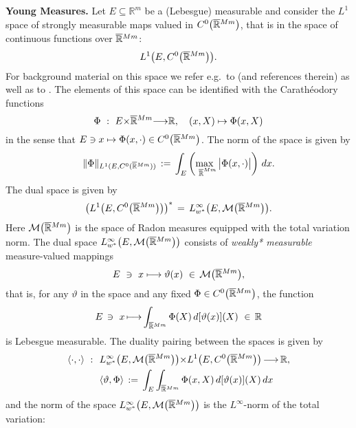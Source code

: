 \documentclass{amsart}
\theoremstyle{definition}
\numberwithin{equation}{section}
\begin{document}
{\medskip}

{\noindent} \textbf{Young Measures.} Let $E{\subseteq} {\mathbb{R}}^m$ be a (Lebesgue) measurable and consider the $L^1$ space of strongly measurable maps valued in $C^0\big(\smash{\overline{\mathbb{R}}}^{Mm}\big)$, that is in the space of continuous functions over $\smash{\overline{\mathbb{R}}}^{Mm}$:
\[
L^1\big( E, C^0\big(\smash{\overline{\mathbb{R}}}^{Mm}\big)\big).
\]
For background material on this space we refer e.g.\ to \cite{FL,FG,Ed,V} (and references therein) as well as to \cite{K8,K9}. The elements of this space can be identified with the Carath\'eodory functions
\[
\Phi\ :\ E {\times} \smash{\overline{\mathbb{R}}}^{Mm} {\longrightarrow} {\mathbb{R}}, \quad (x,X)\mapsto \Phi(x,X)
\]
in the sense that $E\ni x\mapsto \Phi(x,\cdot) \in C^0\big(\smash{\overline{\mathbb{R}}}^{Mm}\big)$. The norm of the space is given by
\[
\| \Phi \|_{L^1( E, C^0(\smash{\overline{\mathbb{R}}}^{Mm}))}\, :=\, \int_E \left(\!\! \max_{\ \ {\overline{\mathbb{R}}}^{Mm}} \big|\Phi(x,\cdot)\big|\right)\, dx.
\]
The dual space is given by 
\[
\left( L^1\big( E, C^0\big(\smash{\overline{\mathbb{R}}}^{Mm}\big)\big) \right)^* \, =\, L^\infty_{w^*}\big( E,{\mathcal{M}} \big(\smash{\overline{\mathbb{R}}}^{Mm}\big) \big).
\]
Here ${\mathcal{M}} \big(\smash{\overline{\mathbb{R}}}^{Mm}\big)$ is the space of Radon measures equipped with the total variation norm. The dual space $L^\infty_{w^*}\big( E,{\mathcal{M}} \big(\smash{\overline{\mathbb{R}}}^{Mm}\big)\big)$ consists of \emph{weakly* measurable} measure-valued mappings
\[
E\ \ni \ x \longmapsto \vartheta(x)  \ \in\, {\mathcal{M}} \big(\smash{\overline{\mathbb{R}}}^{Mm}\big),
\]
that is, for any $\vartheta$ in the space and any fixed $\Phi \in C^0\big(\smash{\overline{\mathbb{R}}}^{Mm}\big)$, the function 
\[
E\, \ni\  x\, {\longmapsto}  \int_{ \smash{\overline{\mathbb{R}}}^{Mm} } \Phi(X)\, d[\vartheta(x)](X) \ \in \, {\mathbb{R}}
\]
is Lebesgue measurable. The duality pairing between the spaces is given by
\[
\begin{split}
\langle\cdot,\cdot\rangle\ :\  \ & L^\infty_{w^*}\big( E,{\mathcal{M}} \big(\smash{\overline{\mathbb{R}}}^{Mm}\big) \big) {\times} L^1\big( E, C^0\big(\smash{\overline{\mathbb{R}}}^{Mm}\big)\big) \, {\longrightarrow} \,{\mathbb{R}},\\
&\langle \vartheta, \Phi \rangle\, :=\, \int_E \int_{ \smash{\overline{\mathbb{R}}}^{Mm} } \Phi(x,X)\, d[\vartheta(x)] (X)\, dx
\end{split}
\]
and the norm of the space $L^\infty_{w^*}\big( E,{\mathcal{M}} \big(\smash{\overline{\mathbb{R}}}^{Mm}\big) \big)$ is the $L^\infty$-norm of the total variation:
\end{document}
